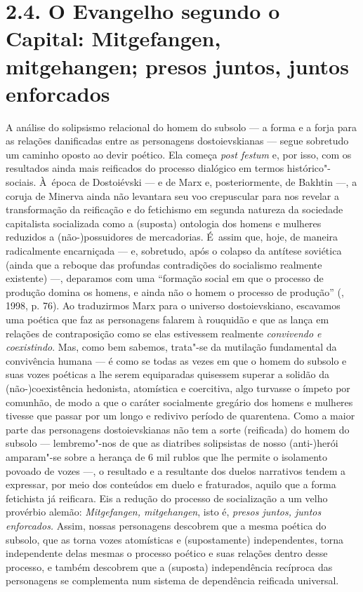 \section{2.4. O Evangelho segundo o Capital: Mitgefangen, mitgehangen; presos juntos, juntos enforcados}

A análise do solipsismo relacional do homem do subsolo --- a forma e a
forja para as relações danificadas entre as personagens dostoievskianas
--- segue sobretudo um caminho oposto ao devir poético. Ela começa
\emph{post festum} e, por isso, com os resultados ainda mais reificados
do processo dialógico em termos histórico"-sociais. À~época de
Dostoiévski --- e de Marx e, posteriormente, de Bakhtin ---, a coruja de
Minerva ainda não levantara seu voo crepuscular para nos revelar a
transformação da reificação e do fetichismo em segunda natureza da
sociedade capitalista socializada como a (suposta) ontologia dos homens
e mulheres reduzidos a \mbox{(não-)possuidores} de mercadorias. É~assim que,
hoje, de maneira radicalmente encarniçada --- e, sobretudo, após o
colapso da antítese soviética (ainda que a reboque das profundas
contradições do socialismo realmente existente) ---, deparamos com uma
``formação social em que o processo de produção domina os homens, e
ainda não o homem o processo de produção'' (, 1998, p. 76). Ao
traduzirmos Marx para o universo dostoievskiano, escavamos uma poética
que faz as personagens falarem à rouquidão e que as lança em relações de
contraposição como se elas estivessem realmente \emph{convivendo e
coexistindo}. Mas, como bem sabemos, trata"-se da mutilação fundamental
da convivência humana --- é como se todas as vezes em que o homem do
subsolo e suas vozes poéticas a lhe serem equiparadas quisessem superar
a solidão da \mbox{(não-)coexistência} hedonista, atomística e coercitiva, algo
turvasse o ímpeto por comunhão, de modo a que o caráter socialmente
gregário dos homens e mulheres tivesse que passar por um longo e
redivivo período de quarentena. Como a maior parte das personagens
dostoievskianas não tem a sorte (reificada) do homem do subsolo ---
lembremo"-nos de que as diatribes solipsistas de nosso \mbox{(anti-)herói}
amparam"-se sobre a herança de 6 mil rublos que lhe permite o isolamento
povoado de vozes ---, o resultado e a resultante dos duelos narrativos
tendem a expressar, por meio dos conteúdos em duelo e fraturados, aquilo
que a forma fetichista já reificara. Eis a redução do processo de
socialização a um velho provérbio alemão: \emph{Mitgefangen,
mitgehangen}, isto é, \emph{presos juntos, juntos enforcados.} Assim,
nossas personagens descobrem que a mesma poética do subsolo, que as
torna vozes atomísticas e (supostamente) independentes, torna
independente delas mesmas o processo poético e suas relações dentro
desse processo, e também descobrem que a (suposta) independência
recíproca das personagens se complementa num sistema de dependência
reificada universal.

